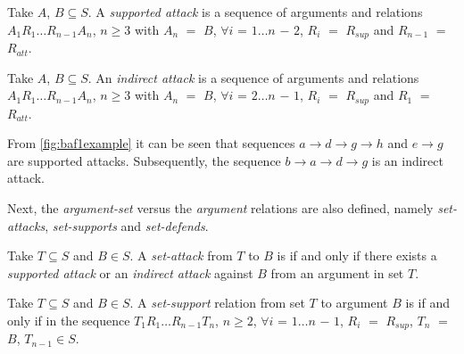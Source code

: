             \begin{definition}
                Take $A$, $B \subseteq S$. A \textit{supported attack} is a sequence of arguments and relations $A_{1} R_{1} \ldots R_{n - 1} A_{n}$, $n \geq 3$ with $A_{n}$ $=$ $B$, $\forall i$ = $1 \ldots n$ $-$ $2$, $R_{i}$ $=$ $R_{sup}$ and $R_{n - 1}$ $=$ $R_{att}$.
                \label{definition:definition11}
            \end{definition}
            
            \begin{definition}
                Take $A$, $B \subseteq S$. An \textit{indirect attack} is a sequence of arguments and relations $A_{1} R_{1} \ldots R_{n - 1} A_{n}$, $n \geq 3$ with $A_{n}$ $=$ $B$, $\forall i$ = $2 \ldots n$ $-$ $1$, $R_{i}$ $=$ $R_{sup}$ and $R_{1}$ $=$ $R_{att}$.
                \label{definition:definition12}
            \end{definition}
            
            \begin{exa}
                From \autoref{fig:baf1example} it can be seen that sequences $a \rightarrow d \rightarrow g \rightarrow h$ and $e \rightarrow g$ are supported attacks. Subsequently, the sequence $b \rightarrow a \rightarrow d \rightarrow g$ is an indirect attack.
                \label{exa:example11}
            \end{exa}
            
            Next, the \textit{argument-set} versus the \textit{argument} relations are also defined, namely \textit{set-attacks}, \textit{set-supports} and \textit{set-defends}.
            
            \begin{definition}
                Take $T \subseteq S$ and $B \in S$. A \textit{set-attack} from $T$ to $B$ is if and only if there exists a \textit{supported attack} or an \textit{indirect attack} against $B$ from an argument in set $T$.
                \label{definition:definition13}
            \end{definition}
            
            \begin{definition}
                Take $T \subseteq S$ and $B \in S$. A \textit{set-support} relation from set $T$ to argument $B$ is if and only if in the sequence $T_{1} R_{1} \ldots R_{n - 1} T_{n}$, $n \geq 2$, $\forall i$ = $1 \ldots n$ $-$ $1$, $R_{i}$ $=$ $R_{sup}$, $T_{n}$ $=$ $B$, $T_{n - 1} \in S$.
                \label{definition:definition14}
            \end{definition}
            
